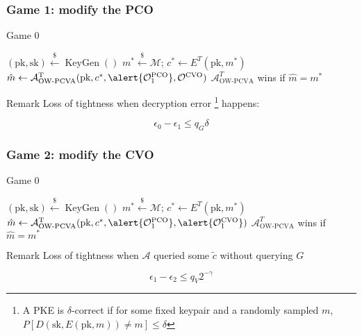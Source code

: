 \documentclass{beamer}
\newcommand{\leftsample}{\overset{{\scriptscriptstyle\$}}{\leftarrow}}
\begin{document}
\begin{frame}
    \frametitle{Game 1: modify the PCO}

    \begin{algorithm}[H]
        \SetAlgoLined
        \caption{Game 0}

        $(\text{pk}, \text{sk}) \leftsample \operatorname{KeyGen}()$\;
        $m^\ast \leftsample \mathcal{M}$;
        $c^\ast \leftarrow E^T(\text{pk}, m^\ast)$\;
        $\hat{m} \leftarrow \mathcal{A}^\text{T}_\text{OW-PCVA}(
            \text{pk}, c^\ast,
            \alert{\mathcal{O}^\text{PCO}_1},
            \mathcal{O}^\text{CVO}
        )$\;
        $\mathcal{A}^T_\text{OW-PCVA}$ wins if $\hat{m} = m^\ast$
    \end{algorithm}

    \begin{block}{Remark}
        Loss of tightness when decryption error \footnote{
            A PKE is $\delta$-correct if for some fixed keypair and a randomly sampled $m$, $P[D(\text{sk}, E(\text{pk}, m)) \neq m] \leq \delta$
        } happens:

        \begin{equation*}
            \epsilon_0 - \epsilon_1 \leq q_G\delta
        \end{equation*}
    \end{block}
\end{frame}

\begin{frame}
    \frametitle{Game 2: modify the CVO}

    \begin{algorithm}[H]
        \SetAlgoLined
        \caption{Game 0}

        $(\text{pk}, \text{sk}) \leftsample \operatorname{KeyGen}()$\;
        $m^\ast \leftsample \mathcal{M}$;
        $c^\ast \leftarrow E^T(\text{pk}, m^\ast)$\;
        $\hat{m} \leftarrow \mathcal{A}^\text{T}_\text{OW-PCVA}(
            \text{pk}, c^\ast,
            \alert{\mathcal{O}^\text{PCO}_1},
            \alert{\mathcal{O}^\text{CVO}_1}
        )$\;
        $\mathcal{A}^T_\text{OW-PCVA}$ wins if $\hat{m} = m^\ast$
    \end{algorithm}

    \begin{block}{Remark}
        Loss of tightness when $\mathcal{A}$ queried some $\tilde{c}$ without querying $G$

        \begin{equation*}
            \epsilon_1 - \epsilon_2 \leq q_V 2^{-\gamma}
        \end{equation*}
    \end{block}
\end{frame}
\end{document}
